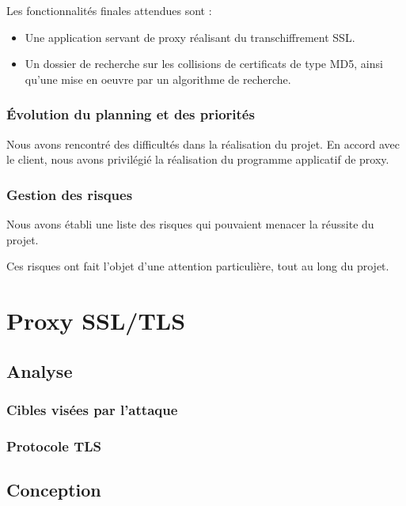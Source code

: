 \documentclass[a4paper,11pt,french]{report}
\begin{document}
Les fonctionnalités finales attendues sont :
\begin{itemize}
\item Une application servant de proxy réalisant du transchiffrement SSL.
\item Un dossier de recherche sur les collisions de certificats de type MD5, ainsi qu'une mise en oeuvre 
par un algorithme de recherche.
\end{itemize}

\subsection{Évolution du planning et des priorités}

Nous avons rencontré des difficultés dans la réalisation du projet.
En accord avec le client, nous avons privilégié la réalisation du programme applicatif de proxy.

\subsection{Gestion des risques}

Nous avons établi une liste des risques qui pouvaient menacer la réussite du projet.

Ces risques ont fait l'objet d'une attention particulière, tout au long du projet.

\chapter{Proxy SSL/TLS}
\section{Analyse}

\subsection{Cibles visées par l'attaque}

\subsection{Protocole TLS}


\section{Conception}
\end{document}
